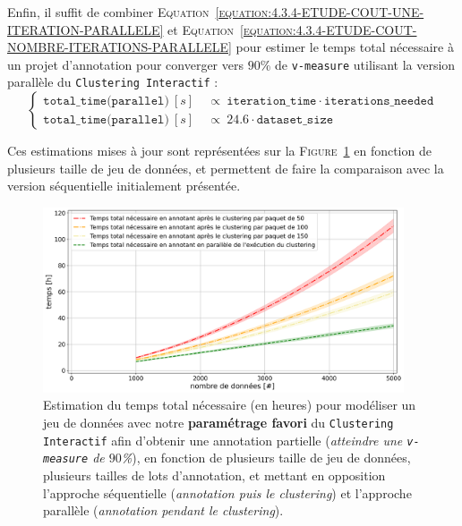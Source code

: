 			Enfin, il suffit de combiner \textsc{Equation~\ref{equation:4.3.4-ETUDE-COUT-UNE-ITERATION-PARALLELE}} et \textsc{Equation~\ref{equation:4.3.4-ETUDE-COUT-NOMBRE-ITERATIONS-PARALLELE}} pour estimer le temps total nécessaire à un projet d'annotation pour converger vers $90$\% de \texttt{v-measure} utilisant la version parallèle du \texttt{Clustering Interactif} :
			\begin{equation}
				\label{equation:4.3.4-ETUDE-COUT-TOTAL-PARALLELE}
				\begin{cases}
					\texttt{total\_time(parallel)}~[s] &
						~\propto~\texttt{iteration\_time} \cdot \texttt{iterations\_needed} \\
					\texttt{total\_time(parallel)}~[s] &
						~\propto~24.6 \cdot \texttt{dataset\_size}
				\end{cases}
			\end{equation}
			
			Ces estimations mises à jour sont représentées sur la \textsc{Figure~\ref{figure:4.3.4-ETUDE-COUT-TOTAL}} en fonction de plusieurs taille de jeu de données, et permettent de faire la comparaison avec la version séquentielle initialement présentée.
			
			\begin{figure}[!htb]
				\centering
				\includegraphics[width=0.95\textwidth]{figures/etude-temps-total-2-modelisation-parallele}
				\caption{
					Estimation du temps total nécessaire (en heures) pour modéliser un jeu de données avec notre \textbf{paramétrage favori} du \texttt{Clustering Interactif} afin d'obtenir une annotation partielle (\textit{atteindre une \texttt{v-measure} de $90$\%}), en fonction de plusieurs taille de jeu de données, plusieurs tailles de lots d'annotation, et mettant en opposition l'approche séquentielle (\textit{annotation puis le \textit{clustering}}) et l'approche parallèle (\textit{annotation pendant le \textit{clustering}}).
				}
				\label{figure:4.3.4-ETUDE-COUT-TOTAL}
			\end{figure}
			

